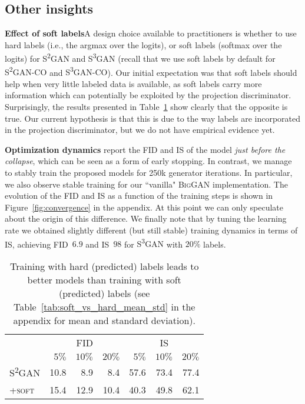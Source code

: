 \documentclass{article}
\newcommand{\cotrainSS}{\textsc{S\textsuperscript{2}GAN-CO}}
\newcommand{\cotrainSSS}{\textsc{S\textsuperscript{3}GAN-CO}}
\newcommand{\tranSS}{\textsc{S\textsuperscript{2}GAN}}
\newcommand{\tranSSS}{\textsc{S\textsuperscript{3}GAN}}
\newcommand{\biggan}{\textsc{BigGAN}}
\begin{document}
\subsection{Other insights} \label{sec:otherinsights}
\textbf{Effect of soft labels}\quad A design choice available to practitioners is whether to use hard labels (i.e., the argmax over the logits), or soft labels (softmax over the logits) for \tranSS{} and \tranSSS{} (recall that we use soft labels by default for \cotrainSS{} and \cotrainSSS{}). Our initial expectation was that soft labels should help when very little labeled data is available, as soft labels carry more information which can potentially be exploited by the projection discriminator. Surprisingly, the results presented in Table~\ref{tab:soft_vs_hard} show clearly that the opposite is true. Our current hypothesis is that this is due to the way labels are incorporated in the projection discriminator, but we do not have empirical evidence yet.

\textbf{Optimization dynamics}\quad \citet{brock2018large} report the FID and IS of the model \emph{just before the collapse}, which can be seen as a form of early stopping. In contrast, we manage to stably train the proposed models for 250k generator iterations. In particular, we also observe stable training for our ``vanilla" \biggan{} implementation. The evolution of the FID and IS as a function of the training steps is shown in Figure~\ref{fig:convergence} in the appendix. At this point we can only speculate about the origin of this difference. We finally note that by tuning the learning rate we obtained slightly different (but still stable) training dynamics in terms of IS, achieving FID~$6.9$ and IS~$98$ for \tranSSS{} with $20\%$ labels.


\begin{table}[t]
\caption{Training with hard (predicted) labels leads to better models than training with soft (predicted) labels (see Table~\ref{tab:soft_vs_hard_mean_std} in the appendix for mean and standard deviation).\vspace{0.2cm}}
\centering
\setlength\tabcolsep{4.5pt}
\begin{tabular}{lrrrrrr}
\toprule
&\multicolumn{3}{c}{\textsc{FID}} & \multicolumn{3}{c}{\textsc{IS}}\\\cmidrule(lr){2-4}\cmidrule(lr){5-7}
&       $5\%$  &  $10\%$ &   $20\%$ &  $5\%$  &  $10\%$ &   $20\%$ \\
\midrule
\tranSS{}       &           10.8 &   8.9 &   8.4 &  57.6 &  73.4 &  77.4 \\
\textsc{+soft}	&           15.4 &  12.9 &  10.4 &  40.3 &  49.8 &  62.1 \\
\bottomrule
\end{tabular} \label{tab:soft_vs_hard}
\end{table}
\end{document}
